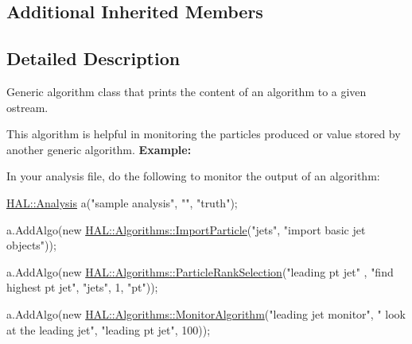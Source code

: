 \subsection*{Additional Inherited Members}


\subsection{Detailed Description}
Generic algorithm class that prints the content of an algorithm to a given ostream. 

This algorithm is helpful in monitoring the particles produced or value stored by another generic algorithm. {\bfseries Example\-:}\par
 In your analysis file, do the following to monitor the output of an algorithm\-:


\begin{DoxyCode}
\hyperlink{class_h_a_l_1_1_analysis}{HAL::Analysis} a(\textcolor{stringliteral}{"sample analysis"}, \textcolor{stringliteral}{""}, \textcolor{stringliteral}{"truth"});

a.AddAlgo(\textcolor{keyword}{new} \hyperlink{class_h_a_l_1_1_algorithms_1_1_import_particle}{HAL::Algorithms::ImportParticle}(\textcolor{stringliteral}{"jets"}, \textcolor{stringliteral}{"import basic jet
       objects"}));

a.AddAlgo(\textcolor{keyword}{new} \hyperlink{class_h_a_l_1_1_algorithms_1_1_particle_rank_selection}{HAL::Algorithms::ParticleRankSelection}(\textcolor{stringliteral}{"leading pt jet"}
      , \textcolor{stringliteral}{"find highest pt jet"}, 
                                                     \textcolor{stringliteral}{"jets"},
                                                     1, \textcolor{stringliteral}{"pt"}));

a.AddAlgo(\textcolor{keyword}{new} \hyperlink{class_h_a_l_1_1_algorithms_1_1_monitor_algorithm}{HAL::Algorithms::MonitorAlgorithm}(\textcolor{stringliteral}{"leading jet monitor"}, \textcolor{stringliteral}{"
      look at the leading jet"}, 
                                                \textcolor{stringliteral}{"leading pt jet"}, 100));
\end{DoxyCode}
 

